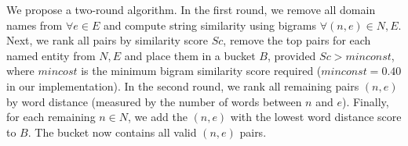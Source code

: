 We propose a two-round algorithm. In the first round, we remove all domain names from $\forall e \in E$ and compute string similarity using bigrams $\forall (n, e) \in N, E$. Next, we rank all pairs by similarity score $Sc$, remove the top pairs for each named entity from $N, E$ and place them in a bucket $B$, provided $Sc > minconst$, where $mincost$ is the minimum bigram similarity score required ($minconst = 0.40$ in our implementation). In the second round, we rank all remaining pairs $(n, e)$ by word distance (measured by the number of words between $n$ and $e$). Finally, for each remaining $n \in N$, we add the $(n, e)$ with the lowest word distance score to $B$. The bucket now contains all valid $(n, e)$ pairs.